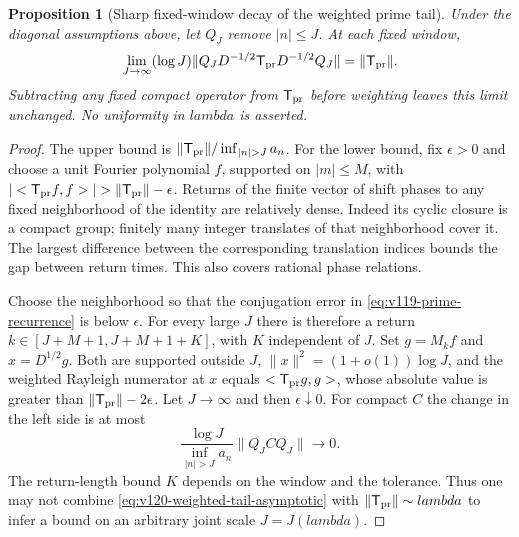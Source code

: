 \documentclass[11pt]{article}
\def\lambda{lambda}%
\def\ip#1#2{<#1,#2>}%
\newtheorem{proposition}[theorem]{Proposition}
\theoremstyle{remark}
\newcommand{\ip}[2]{\left\langle #1,#2\right\rangle}
\begin{document}
\begin{proposition}[Sharp fixed-window decay of the weighted prime tail]
\label{prop:v120-weighted-tail-asymptotic}
Under the diagonal assumptions above, let $Q_J$ remove $|n|\le J$.
At each fixed window,
\begin{equation}\label{eq:v120-weighted-tail-asymptotic}
 \lim_{J\to\infty}(\log J)
 \|Q_JD^{-1/2}\mathsf T_{\rm pr}D^{-1/2}Q_J\|
       =\|\mathsf T_{\rm pr}\|.
\end{equation}
Subtracting any fixed compact operator from $\mathsf T_{\rm pr}$
before weighting leaves this limit unchanged. No uniformity in
$\lambda$ is asserted.
\end{proposition}
\begin{proof}
The upper bound is
$\|\mathsf T_{\rm pr}\|/\inf_{|n|>J}a_n$.
For the lower bound, fix $\epsilon>0$ and choose a unit Fourier
polynomial $f$, supported on $|m|\le M$, with
$|\ip{\mathsf T_{\rm pr}f}{f}|>\|\mathsf T_{\rm pr}\|-\epsilon$.
Returns of the finite vector of shift phases to any fixed neighborhood
of the identity are relatively dense. Indeed its cyclic closure is a
compact group; finitely many integer translates of that neighborhood
cover it. The largest difference between the corresponding translation
indices bounds the gap between return times. This also covers rational
phase relations.

Choose the neighborhood so that the conjugation error in
\eqref{eq:v119-prime-recurrence} is below $\epsilon$.
For every large $J$ there is therefore a return
$k\in[J+M+1,J+M+1+K]$, with $K$ independent of $J$.
Set $g=M_kf$ and $x=D^{1/2}g$. Both are supported outside $J$,
$\|x\|^2=(1+o(1))\log J$, and the weighted Rayleigh numerator
at $x$ equals $\ip{\mathsf T_{\rm pr}g}{g}$, whose absolute value
is greater than $\|\mathsf T_{\rm pr}\|-2\epsilon$.
Let $J\to\infty$ and then $\epsilon\downarrow0$.
For compact $C$ the change in the left side is at most
\[
 \frac{\log J}{\inf_{|n|>J}a_n}\|Q_JCQ_J\|\longrightarrow0.
\]
The return-length bound $K$ depends on the window and the tolerance.
Thus one may not combine \eqref{eq:v120-weighted-tail-asymptotic}
with $\|\mathsf T_{\rm pr}\|\sim\lambda$ to infer a bound on
an arbitrary joint scale $J=J(\lambda)$.
\end{proof}
\end{document}
